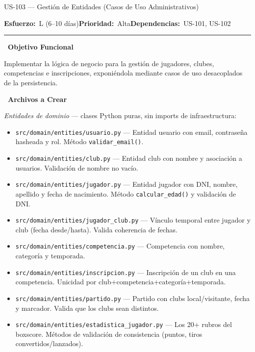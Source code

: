 \documentclass[11pt,a4paper]{article}
\newcommand{\fpath}[1]{\texttt{\small #1}}
\newcommand{\usfield}[2][\;]{%
  \par\vspace{5pt}%
  {\small\textbf{\textcolor{primary}{#2}}}\par\vspace{2pt}%
}
\newcommand{\usmeta}[3]{%
  \vspace{2pt}%
  {\small\textcolor{secondary}{%
    \textbf{Esfuerzo:}~#1\quad\textbf{Prioridad:}~#2\quad\textbf{Dependencias:}~#3%
  }}%
  \par\vspace{4pt}%
  \textcolor{bordergray}{\rule{\linewidth}{0.4pt}}\par\vspace{4pt}%
}
\begin{document}
\begin{uscard}{US-103 — Gestión de Entidades (Casos de Uso Administrativos)}

\usmeta{L (6–10 días)}{Alta}{US-101, US-102}

\usfield{\faAlignLeft\ Objetivo Funcional}
Implementar la lógica de negocio para la gestión de jugadores, clubes, competencias e inscripciones, exponiéndola mediante casos de uso desacoplados de la persistencia.

\usfield{\faFolderOpen\ Archivos a Crear}

\textit{Entidades de dominio} — clases Python puras, sin imports de infraestructura:
\begin{itemize}[nosep, leftmargin=1.6em]
  \item \fpath{src/domain/entities/usuario.py} — Entidad usuario con email, contraseña hasheada y rol. Método \fpath{validar\_email()}.
  \item \fpath{src/domain/entities/club.py} — Entidad club con nombre y asociación a usuarios. Validación de nombre no vacío.
  \item \fpath{src/domain/entities/jugador.py} — Entidad jugador con DNI, nombre, apellido y fecha de nacimiento. Método \fpath{calcular\_edad()} y validación de DNI.
  \item \fpath{src/domain/entities/jugador\_club.py} — Vínculo temporal entre jugador y club (fecha desde/hasta). Valida coherencia de fechas.
  \item \fpath{src/domain/entities/competencia.py} — Competencia con nombre, categoría y temporada.
  \item \fpath{src/domain/entities/inscripcion.py} — Inscripción de un club en una competencia. Unicidad por club+competencia+categoría+temporada.
  \item \fpath{src/domain/entities/partido.py} — Partido con clubs local/visitante, fecha y marcador. Valida que los clubs sean distintos.
  \item \fpath{src/domain/entities/estadistica\_jugador.py} — Los 20+ rubros del boxscore. Métodos de validación de consistencia (puntos, tiros convertidos/lanzados).
\end{itemize}


\end{uscard}
\end{document}
